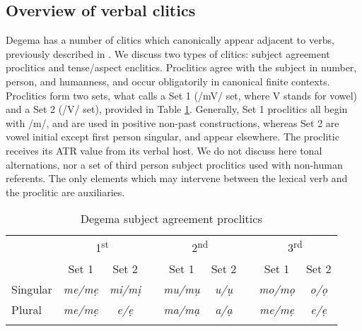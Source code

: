 \documentclass[output=paper]{langsci/langscibook}
\begin{document}
\subsection{Overview of verbal clitics}\label{sec:rolle:2.1}

Degema has a number of clitics which canonically appear adjacent to verbs, previously described in \citet{Kari2002a,Kari2002b,Kari2002c,Kari2002d,Kari2003b,Kari2004,Kari2005}. We discuss two types of clitics: subject agreement proclitics and tense/aspect enclitics. Proclitics agree with the subject in number, person, and humanness, and occur obligatorily in canonical finite contexts. Proclitics form two sets, what \citet[333-335]{Kari2004} calls a Set 1 (/mV/ set, where V stands for vowel) and a Set 2 (/V/ set), provided in Table \ref{bkm:Ref447870844}. Generally, Set 1 proclitics all begin with /m/, and are used in positive non-past constructions, whereas Set 2 are vowel initial except first person singular, and appear elsewhere. The proclitic receives its ATR value from its verbal host. We do not discuss here tonal alternations, nor a set of third person subject proclitics used with non-human referents. The only elements which may intervene between the lexical verb and the proclitic are auxiliaries.

\begin{table}

\begin{tabularx}{\textwidth}{Xcc c cc c cc}
\lsptoprule
    & \multicolumn{2}{c}{1\textsuperscript{st}} &&\multicolumn{2}{c}{2\textsuperscript{nd}} && \multicolumn{2}{c}{3\textsuperscript{rd}}\\
 \cmidrule{2-3}
 \cmidrule{5-6} 
 \cmidrule{8-9} 
   & {Set 1} & {Set 2} && {Set 1} & {Set 2} && {Set 1}& {Set 2} \\
    \midrule
{Singular} & {\itshape me/mẹ} & {\itshape mi/mị} && {\itshape mu/mụ} & {\itshape u/ụ} && {\itshape mo/mọ} & {\itshape o/ọ}\\
{Plural} & {\itshape me/mẹ} & {\itshape e/ẹ} && {\itshape ma/mạ} & {\itshape a/ạ} && {\itshape me/mẹ} & {\itshape e/ẹ}\\
\lspbottomrule
\end{tabularx}
\caption{Degema subject agreement proclitics}
\label{bkm:Ref447870844}
\end{table}
\end{document}
